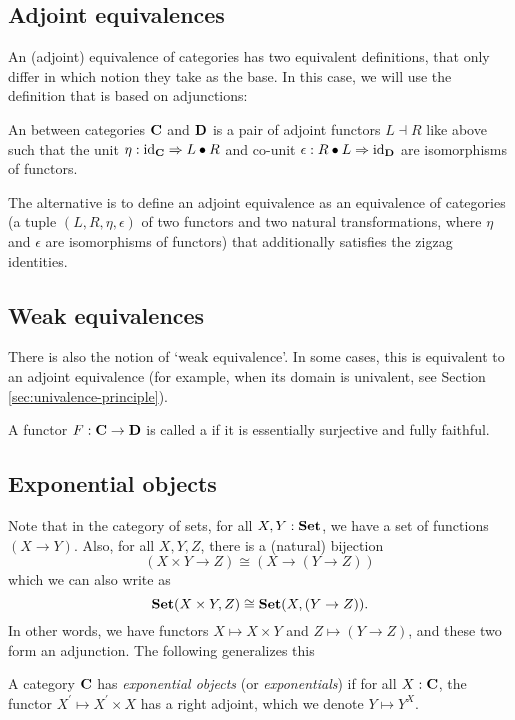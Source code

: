 \subsection{Adjoint equivalences}
An (adjoint) equivalence of categories has two equivalent definitions, that only differ in which notion they take as the base. In this case, we will use the definition that is based on adjunctions:
\begin{definition}\label{def:equivalence-of-categories}
  An  between categories $ \mathbf{C} $ and $ \mathbf{D} $ is a pair of adjoint functors $ L \dashv R $ like above such that the unit $ \eta: \text{id}_{\mathbf{C}} \Rightarrow L \bullet R $ and co-unit $ \epsilon: R \bullet L \Rightarrow \text{id}_{\mathbf{D}} $ are isomorphisms of functors.
\end{definition}

The alternative is to define an adjoint equivalence as an equivalence of categories (a tuple $ (L, R, \eta, \epsilon) $ of two functors and two natural transformations, where $ \eta $ and $ \epsilon $ are isomorphisms of functors) that additionally satisfies the zigzag identities.

\subsection{Weak equivalences}
There is also the notion of `weak equivalence'. In some cases, this is equivalent to an adjoint equivalence (for example, when its domain is univalent, see Section \ref{sec:univalence-principle}).
\begin{definition}
  A functor $ F: \mathbf{C} \to \mathbf{D} $ is called a  if it is essentially surjective and fully faithful.
\end{definition}

\subsection{Exponential objects}
Note that in the category of sets, for all $ X, Y: \mathbf{Set} $, we have a set of functions $ (X \to Y) $. Also, for all $ X, Y, Z $, there is a (natural) bijection
\[ (X \times Y \to Z) \cong (X \to (Y \to Z)) \]
which we can also write as
\[ \mathbf{Set}(X \times Y, Z) \cong \mathbf{Set}(X, (Y \to Z)). \]
In other words, we have functors $ X \mapsto X \times Y $ and $ Z \mapsto (Y \to Z) $, and these two form an adjunction. The following generalizes this
\begin{definition}
  A category $ \mathbf{C} $ has \textit{exponential objects} (or \textit{exponentials}) if for all $ X: \mathbf{C} $, the functor $ X^\prime \mapsto X^\prime \times X $ has a right adjoint, which we denote $ Y \mapsto Y^X $.
\end{definition}

